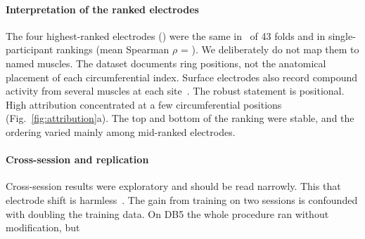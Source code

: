 \paragraph{Interpretation of the ranked electrodes}
The four highest-ranked electrodes (\TopFourSet) were the same in \TopFourFolds\ of 43 folds and in single-participant rankings (mean Spearman $\rho$ = \StabSubjRho). We deliberately do not map them to named muscles. The dataset documents ring positions, not the anatomical placement of each circumferential index. Surface electrodes also record compound activity from several muscles at each site~\cite{farina2004extraction}. The robust statement is positional. High attribution concentrated at a few circumferential positions (Fig.~\ref{fig:attribution}a). The top and bottom of the ranking were stable, and the ordering varied mainly among mid-ranked electrodes. 

\paragraph{Cross-session and replication}
Cross-session results were exploratory and should be read narrowly.  This  that electrode shift is harmless~\cite{hargrove2006effect,kaufmann2010fluctuating,vidovic2016improving}. The gain from training on two sessions is confounded with doubling the training data. On DB5 the whole procedure ran without modification, but  

